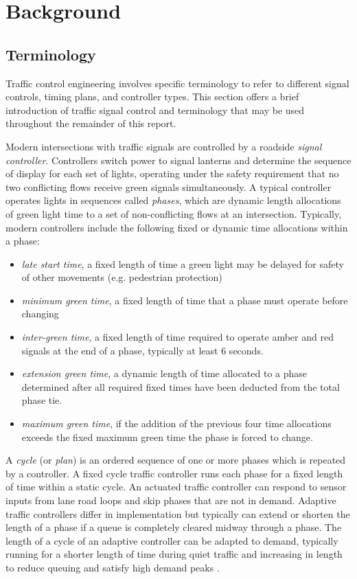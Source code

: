 \chapter{Background}

\section{Terminology}

Traffic control engineering involves specific terminology to refer to different signal controls, timing plans, and controller types. This section offers a brief introduction of traffic signal control and terminology that may be used throughout the remainder of this report.

Modern intersections with traffic signals are controlled by a roadside \emph{signal controller}. Controllers switch power to signal lanterns and determine the sequence of display for each set of lights, operating under the safety requirement that no two conflicting flows receive green signals simultaneously. A typical controller operates lights in sequences called \emph{phases}, which are dynamic length allocations of green light time to a set of non-conflicting flows at an intersection. Typically, modern controllers include the following fixed or dynamic time allocations within a phase:

\begin{itemize}
\item \emph{late start time}, a fixed length of time a green light may be delayed for safety of other movements (e.g. pedestrian protection)
\item \emph{minimum green time}, a fixed length of time that a phase must operate before changing
\item \emph{inter-green time}, a fixed length of time required to operate amber and red signals at the end of a phase, typically at least 6 seconds. 
\item \emph{extension green time}, a dynamic length of time allocated to a phase determined after all required fixed times have been deducted from the total phase tie. 
\item \emph{maximum green time}, if the addition of the previous four time allocations exceeds the fixed maximum green time the phase is forced to change. 
\end{itemize}

A \emph{cycle} (or \emph{plan}) is an ordered sequence of one or more phases which is repeated by a controller. A fixed cycle traffic controller runs each phase for a fixed length of time within a static cycle. An actuated traffic controller can respond to sensor inputs from lane road loops and skip phases that are not in demand. Adaptive traffic controllers differ in implementation but typically can extend or shorten the length of a phase if a queue is completely cleared midway through a phase. The length of a cycle of an adaptive controller can be adapted to demand, typically running for a shorter length of time during quiet traffic and increasing in length to reduce queuing and satisfy high demand peaks \cite{scatstraining}.


